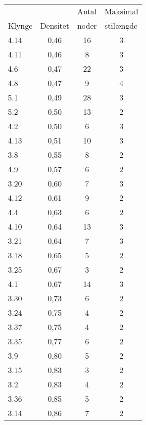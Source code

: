 \begin{tabular}{lccc}
      &       & \multicolumn{1}{l}{Antal} & \multicolumn{1}{l}{Maksimal } \\
Klynge & \multicolumn{1}{l}{Densitet} & \multicolumn{1}{l}{noder} & \multicolumn{1}{l}{stilængde} \\
\midrule
4.14  & 0,46  & 16    &  3 \\
4.11  & 0,46  &  8    &  3 \\
4.6   & 0,47  & 22    &  3 \\
4.8   & 0,47  &  9    &  4 \\
5.1   & 0,49  & 28    &  3 \\
5.2   & 0,50  & 13    &  2 \\
4.2   & 0,50  &  6    &  3 \\
4.13  & 0,51  & 10    &  3 \\
3.8   & 0,55  &  8    &  2 \\
4.9   & 0,57  &  6    &  2 \\
3.20  & 0,60  &  7    &  3 \\
4.12  & 0,61  &  9    &  2 \\
4.4   & 0,63  &  6    &  2 \\
4.10  & 0,64  & 13    &  3 \\
3.21  & 0,64  &  7    &  3 \\
3.18  & 0,65  &  5    &  2 \\
3.25  & 0,67  &  3    &  2 \\
4.1   & 0,67  & 14    &  3 \\
3.30  & 0,73  &  6    &  2 \\
3.24  & 0,75  &  4    &  2 \\
3.37  & 0,75  &  4    &  2 \\
3.35  & 0,77  &  6    &  2 \\
3.9   & 0,80  &  5    &  2 \\
3.15  & 0,83  &  3    &  2 \\
3.2   & 0,83  &  4    &  2 \\
3.36  & 0,85  &  5    &  2 \\
3.14  & 0,86  &  7    &  2 \\
\bottomrule
\end{tabular}%
